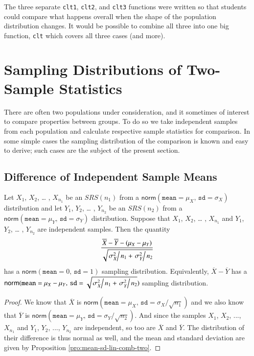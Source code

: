 \documentclass[captions=tableheading]{scrbook}
\begin{document}
The three separate \texttt{clt1}, \texttt{clt2}, and \texttt{clt3} functions were written so that students could compare what happens overall when the shape of the population distribution changes. It would be possible to combine all three into one big function, \texttt{clt} which covers all three cases (and more). 
\section{Sampling Distributions of Two-Sample Statistics}
\label{sec-8-4}

\label{sec:Samp-Dist-Two-Samp}

There are often two populations under consideration, and it sometimes of interest to compare properties between groups. To do so we take independent samples from each population and calculate respective sample statistics for comparison. In some simple cases the sampling distribution of the comparison is known and easy to derive; such cases are the subject of the present section.
\subsection{Difference of Independent Sample Means}
\label{sec-8-4-1}

\begin{prop}
Let \(X_{1}\), \(X_{2}\), \ldots{} , \(X_{n_{1}}\) be an \(SRS(n_{1})\) from a \(\mathsf{norm}(\mathtt{mean}=\mu_{X},\,\mathtt{sd}=\sigma_{X})\) distribution and let \(Y_{1}\), \(Y_{2}\), \ldots{} , \(Y_{n_{2}}\) be an \(SRS(n_{2})\) from a \(\mathsf{norm}(\mathtt{mean}=\mu_{Y},\,\mathtt{sd}=\sigma_{Y})\) distribution. Suppose that \(X_{1}\), \(X_{2}\), \ldots{} , \(X_{n_{1}}\) and \(Y_{1}\), \(Y_{2}\), \ldots{} , \(Y_{n_{2}}\) are independent samples. Then the quantity
\begin{equation}
\frac{\overline{X}-\overline{Y}-(\mu_{X}-\mu_{Y})}{\sqrt{\left.\sigma_{X}^{2}\right\slash n_{1}+\left.\sigma_{Y}^{2}\right\slash n_{2}}}\label{eq:diff-indep-sample-means}\end{equation}
has a \(\mathsf{norm}(\mathtt{mean}=0,\,\mathtt{sd}=1)\) sampling distribution. Equivalently, \(\overline{X}-\overline{Y}\) has a \(\mathsf{norm}(\mathtt{mean}=\mu_{X}-\mu_{Y},\,\mathtt{sd}=\sqrt{\left.\sigma_{X}^{2}\right\slash n_{1}+\left.\sigma_{Y}^{2}\right\slash n_{2}})\) sampling distribution.
\end{prop}

\begin{proof}
We know that \(\overline{X}\) is \(\mathsf{norm}(\mathtt{mean}=\mu_{X},\,\mathtt{sd}=\sigma_{X}/\sqrt{n_{1}})\) and we also know that \(\overline{Y}\) is \(\mathsf{norm}(\mathtt{mean}=\mu_{Y},\,\mathtt{sd}=\sigma_{Y}/\sqrt{n_{2}})\). And since the samples \(X_{1}\), \(X_{2}\), ..., \(X_{n_{1}}\) and \(Y_{1}\), \(Y_{2}\), ..., \(Y_{n_{2}}\) are independent, so too are \(\overline{X}\) and \(\overline{Y}\). The distribution of their difference is thus normal as well, and the mean and standard deviation are given by Proposition \ref{pro:mean-sd-lin-comb-two}.
\end{proof}
\end{document}
